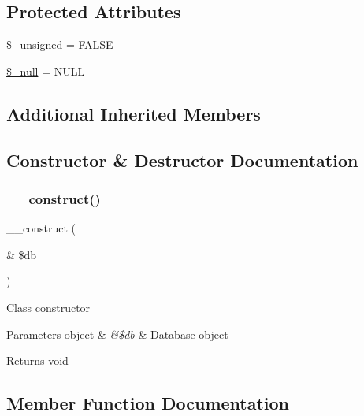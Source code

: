 \subsection*{Protected Attributes}
\begin{DoxyCompactItemize}
\item 
\mbox{\hyperlink{class_c_i___d_b__sqlite3__forge_aae977ae6d61fa183f0b25422b6ddc31c}{\$\+\_\+unsigned}} = F\+A\+L\+SE
\item 
\mbox{\hyperlink{class_c_i___d_b__sqlite3__forge_ae58fe6a5104d4a069a49b27533ce808f}{\$\+\_\+null}} = \textquotesingle{}N\+U\+LL\textquotesingle{}
\end{DoxyCompactItemize}
\subsection*{Additional Inherited Members}


\subsection{Constructor \& Destructor Documentation}
\mbox{\label{class_c_i___d_b__sqlite3__forge_aaf2ef772755ec6f361d44e16cc9ffd69}} 
\subsubsection{\texorpdfstring{\+\_\+\+\_\+construct()}{\_\_construct()}}
{\footnotesize\ttfamily \+\_\+\+\_\+construct (\begin{DoxyParamCaption}\item[{\&}]{\$db }\end{DoxyParamCaption})}

Class constructor


\begin{DoxyParams}[1]{Parameters}
object & {\em \&\$db} & Database object \\
\hline
\end{DoxyParams}
\begin{DoxyReturn}{Returns}
void 
\end{DoxyReturn}


\subsection{Member Function Documentation}
\mbox{\label{class_c_i___d_b__sqlite3__forge_a41c6cae02f2fda8b429ad0afb9509426}} 
